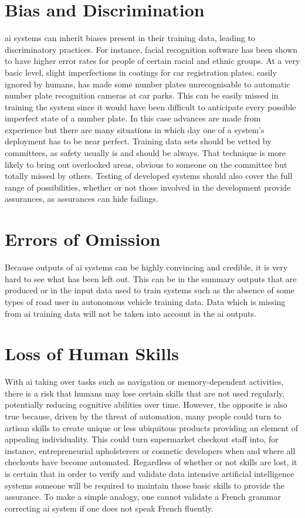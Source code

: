 \section{Bias and Discrimination}
\gls{ai} systems can inherit biases present in their training data, leading to discriminatory practices. For instance, facial recognition software has been shown to have higher error rates for people of certain racial and ethnic groups. At a very basic level, slight imperfections in coatings for car registration plates, easily ignored by humans, has made some number plates unrecognisable to automatic number plate recognition cameras at car parks. This can be easily missed in training the system since it would have been difficult to anticipate every possible imperfect state of a number plate. In this case advances are made from experience but there are many situations in which day one of a system’s deployment has to be near perfect. Training data sets should be vetted by committees, as safety usually is and should be always. That technique is more likely to bring out overlooked areas, obvious to someone on the committee but totally missed by others. Testing of developed systems should also cover the full range of possibilities, whether or not those involved in the development provide assurances, as assurances can hide failings.

\section{Errors of Omission}
Because outputs of \gls{ai} systems can be highly convincing and credible, it is very hard to see what has been left out. This can be in the summary outputs that are produced or in the input data used to train systems such as the absence of some types of road user in autonomous vehicle training data. Data which is missing from \gls{ai} training data will not be taken into account in the \gls{ai} outputs.

\section{Loss of Human Skills}
With \gls{ai} taking over tasks such as navigation or memory-dependent activities, there is a risk that humans may lose certain skills that are not used regularly, potentially reducing cognitive abilities over time.  However, the opposite is also true because, driven by the threat of automation, many people could turn to artisan skills to create unique or less ubiquitous products providing an element of appealing individuality. This could turn supermarket checkout staff into, for instance, entrepreneurial upholsterers or cosmetic developers when and where all checkouts have become automated. Regardless of whether or not skills are lost, it is certain that in order to verify and validate data intensive artificial intelligence systems someone will be required to maintain those basic skills to provide the assurance. To make a simple analogy, one cannot validate a French grammar correcting \gls{ai} system if one does not speak French fluently.

